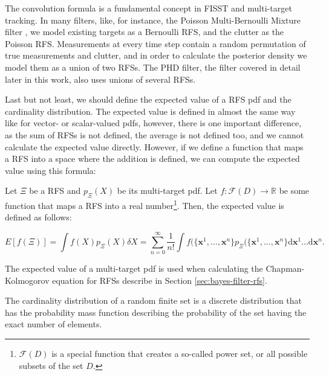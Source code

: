 The convolution formula is a fundamental concept in FISST and multi-target tracking. In many filters, like, for instance, the Poisson Multi-Bernoulli Mixture filter \cite{garcia-fernandezPoissonMultiBernoulliMixture2018}, we model existing targets as a Bernoulli RFS, and the clutter as the Poisson RFS. Measurements at every time step contain a random permutation of true measurements and clutter, and in order to calculate the posterior density we model them as a union of two RFSs. The PHD filter, the filter covered in detail later in this work, also uses unions of several RFSs.

Last but not least, we should define the expected value of a RFS pdf and the cardinality distribution. The expected value is defined in almost the same way like for vector- or scalar-valued pdfs, however, there is one important difference, as the sum of RFSs is not defined, the average is not defined too, and we cannot calculate the expected value directly. However, if we define a function that maps a RFS into a space where the addition is defined, we can compute the expected value using this formula:

\begin{definition}
    Let $\Xi$ be a RFS and $p_\Xi(X)$ be its multi-target pdf. Let $f: \mathcal{F}(D) \rightarrow \mathbb{R}$ be some function that maps a RFS into a real number\footnote{$\mathcal{F}(D)$ is a special function that creates a so-called power set, or all possible subsets of the set $D$.}. Then, the expected value is defined as follows:

    \begin{equation}
        E[f(\Xi)] = \int f(X)p_\Xi(X) \delta X
        = \sum_{n=0}^\infty \frac{1}{n !}
        \int f(\{\mathbf{x}^1, \ldots, \mathbf{x}^n\}
        p_\Xi(\{\mathbf{x}^1, \ldots, \mathbf{x}^n\}
        \mathrm{d}\mathbf{x}^1 \ldots \mathrm{d}\mathbf{x}^n.
    \end{equation}
\end{definition}

The expected value of a multi-target pdf is used when calculating the Chapman-Kolmogorov equation for RFSs describe in Section \ref{sec:bayes-filter-rfs}.

The cardinality distribution of a random finite set is a discrete distribution that has the probability mass function describing the probability of the set having the exact number of elements. 


